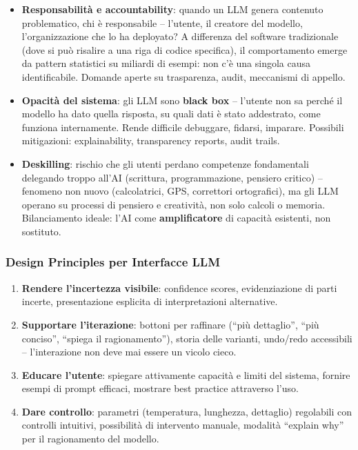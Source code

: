 \documentclass[12pt,a4paper]{article}
\begin{document}
\begin{itemize}
  \item \textbf{Responsabilit\`a e accountability}: quando un LLM genera contenuto problematico, chi \`e responsabile -- l'utente, il creatore del modello, l'organizzazione che lo ha deployato? A differenza del software tradizionale (dove si pu\`o risalire a una riga di codice specifica), il comportamento emerge da pattern statistici su miliardi di esempi: non c'\`e una singola causa identificabile. Domande aperte su trasparenza, audit, meccanismi di appello.
  \item \textbf{Opacit\`a del sistema}: gli LLM sono \textbf{black box} -- l'utente non sa perch\'e il modello ha dato quella risposta, su quali dati \`e stato addestrato, come funziona internamente. Rende difficile debuggare, fidarsi, imparare. Possibili mitigazioni: explainability, transparency reports, audit trails.
  \item \textbf{Deskilling}: rischio che gli utenti perdano competenze fondamentali delegando troppo all'AI (scrittura, programmazione, pensiero critico) -- fenomeno non nuovo (calcolatrici, GPS, correttori ortografici), ma gli LLM operano su processi di pensiero e creativit\`a, non solo calcoli o memoria. Bilanciamento ideale: l'AI come \textbf{amplificatore} di capacit\`a esistenti, non sostituto.
\end{itemize}

\subsubsection{Design Principles per Interfacce LLM}

\begin{enumerate}
  \item \textbf{Rendere l'incertezza visibile}: confidence scores, evidenziazione di parti incerte, presentazione esplicita di interpretazioni alternative.
  \item \textbf{Supportare l'iterazione}: bottoni per raffinare (``pi\`u dettaglio'', ``pi\`u conciso'', ``spiega il ragionamento''), storia delle varianti, undo/redo accessibili -- l'interazione non deve mai essere un vicolo cieco.
  \item \textbf{Educare l'utente}: spiegare attivamente capacit\`a e limiti del sistema, fornire esempi di prompt efficaci, mostrare best practice attraverso l'uso.
  \item \textbf{Dare controllo}: parametri (temperatura, lunghezza, dettaglio) regolabili con controlli intuitivi, possibilit\`a di intervento manuale, modalit\`a ``explain why'' per il ragionamento del modello.
\end{enumerate}
\end{document}

